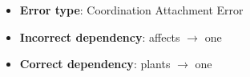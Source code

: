 \ifans{}
\begin{itemize}
    \item \textbf{Error type}: Coordination Attachment Error
    \item \textbf{Incorrect dependency}: affects $\rightarrow$ one
    \item \textbf{Correct dependency}: plants $\rightarrow$ one
\end{itemize}